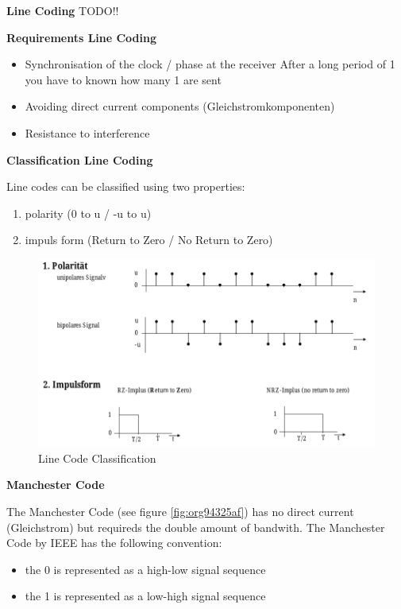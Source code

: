 \documentclass[11pt,twoside,twocolumn,landscape]{article}
\begin{document}
\textbf{Line Coding}
TODO!!

\textbf{Requirements Line Coding}

\begin{itemize}
\item Synchronisation of the clock / phase at the receiver
After a long period of 1 you have to known how many 1 are sent
\item Avoiding direct current components (Gleichstromkomponenten)
\item Resistance to interference
\end{itemize}


\textbf{Classification Line Coding}

Line codes can be classified using two properties:
\begin{enumerate}
\item polarity (0 to u / -u to u)
\item impuls form (Return to Zero / No Return to Zero)
\end{enumerate}


\begin{figure}[htbp]
\centering
\includegraphics[width=.9\linewidth]{img/line_code_classification.png}
\caption{Line Code Classification}
\end{figure}

\textbf{Manchester Code}

The Manchester Code (see figure \ref{fig:org94325af}) has no direct current (Gleichstrom) but requireds the double amount of bandwith.
The Manchester Code by IEEE has the following convention:
\begin{itemize}
\item the 0 is represented as a high-low signal sequence
\item the 1 is represented as a low-high signal sequence
\end{itemize}
\end{document}
